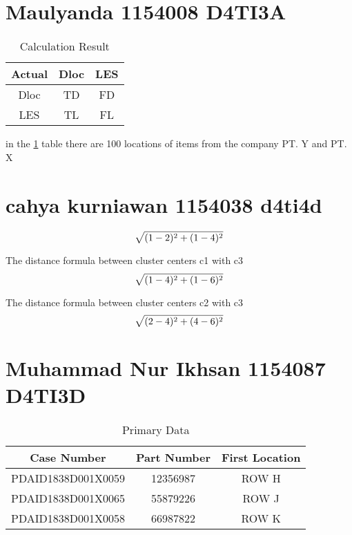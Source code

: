 \section{Maulyanda 1154008 D4TI3A}
\begin{table}[h]
    \centering
    \begin{tabular}{ccc}
    \hline
        Actual & Dloc & LES  \\
    \hline
         Dloc & TD & FD \\
         LES & TL & FL \\
    \hline
    \end{tabular}
    \caption{Calculation Result}
    \label{table1}
\end{table}

\par
in the \ref{table1} table there are 100 locations of items from the company PT. Y and PT. X

\section{cahya kurniawan 1154038 d4ti4d}
\par
\begin{equation}
\label{eq:1}
\sqrt{(1-2)\sp{2} + (1-4)\sp{2}}
    \end{equation}
\par
The distance formula between cluster centers c1 with c3
\begin{equation}
\label{eq:2}
\sqrt{(1-4)\sp{2} + (1-6)\sp{2}}
    \end{equation}
\par
The distance formula between cluster centers c2 with c3
\begin{equation}
\label{eq:3}
\sqrt{(2-4)\sp{2} + (4-6)\sp{2}}
    \end{equation}

\section{Muhammad Nur Ikhsan 1154087 D4TI3D}
\begin{table}[h]
\caption{Primary Data}
\centering
\begin{tabular}{ccc}
\hline
Case Number & Part Number & First Location \\
\hline
PDAID1838D001X0059 & 12356987 & ROW H \\
PDAID1838D001X0065 & 55879226 & ROW J \\
PDAID1838D001X0058 & 66987822 & ROW K \\
\hline
\end{tabular}
\label{table2}
\end{table}
